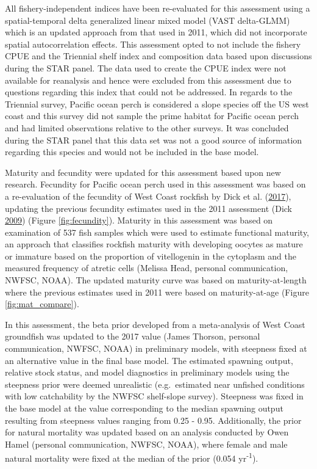 \documentclass[12pt,]{article}
\begin{document}
All fishery-independent indices have been re-evaluated for this
assessment using a spatial-temporal delta generalized linear mixed model
(VAST delta-GLMM) which is an updated approach from that used in 2011,
which did not incorporate spatial autocorrelation effects. This
assessment opted to not include the fishery CPUE and the Triennial shelf
index and composition data based upon discussions during the STAR panel.
The data used to create the CPUE index were not available for reanalysis
and hence were excluded from this assessment due to questions regarding
this index that could not be addressed. In regards to the Triennial
survey, Pacific ocean perch is considered a slope species off the US
west coast and this survey did not sample the prime habitat for Pacific
ocean perch and had limited observations relative to the other surveys.
It was concluded during the STAR panel that this data set was not a good
source of information regarding this species and would not be included
in the base model.

Maturity and fecundity were updated for this assessment based upon new
research. Fecundity for Pacific ocean perch used in this assessment was
based on a re-evaluation of the fecundity of West Coast rockfish by Dick
et al. (\protect\hyperlink{ref-dick_meta-analysis_2017}{2017}), updating
the previous fecundity estimates used in the 2011 assessment (Dick
\protect\hyperlink{ref-dick_modeling_2009}{2009}) (Figure
\ref{fig:fecundity}). Maturity in this assessment was based on
examination of 537 fish samples which were used to estimate functional
maturity, an approach that classifies rockfish maturity with developing
oocytes as mature or immature based on the proportion of vitellogenin in
the cytoplasm and the measured frequency of atretic cells (Melissa Head,
personal communication, NWFSC, NOAA). The updated maturity curve was
based on maturity-at-length where the previous estimates used in 2011
were based on maturity-at-age (Figure \ref{fig:mat_compare}).

In this assessment, the beta prior developed from a meta-analysis of
West Coast groundfish was updated to the 2017 value (James Thorson,
personal communication, NWFSC, NOAA) in preliminary models, with
steepness fixed at an alternative value in the final base model. The
estimated spawning output, relative stock status, and model diagnostics
in preliminary models using the steepness prior were deemed unrealistic
(e.g.~estimated near unfished conditions with low catchability by the
NWFSC shelf-slope survey). Steepness was fixed in the base model at the
value corresponding to the median spawning output resulting from
steepness values ranging from 0.25 - 0.95. Additionally, the prior for
natural mortality was updated based on an analysis conducted by Owen
Hamel (personal communication, NWFSC, NOAA), where female and male
natural mortality were fixed at the median of the prior (0.054
yr\textsuperscript{-1}).
\end{document}
